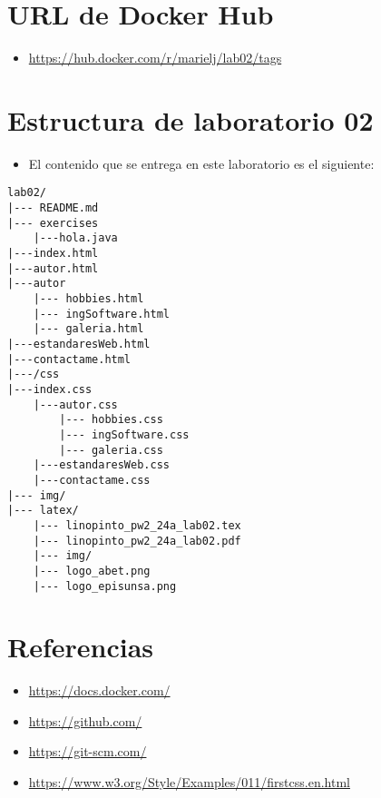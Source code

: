\documentclass{article}
\newcommand{\itemPracticeNumber}{02}
\begin{document}
\section{URL de Docker Hub}
\begin{itemize}
	\item \url{https://hub.docker.com/r/marielj/lab02/tags}
\end{itemize}

\section{Estructura de laboratorio \itemPracticeNumber}
\begin{itemize}
	\item El contenido que se entrega en este laboratorio es el siguiente:
\end{itemize}
\begin{lstlisting}[style=ascii-tree]
lab02/
|--- README.md
|--- exercises
    |---hola.java
|---index.html
|---autor.html
|---autor
    |--- hobbies.html
    |--- ingSoftware.html
    |--- galeria.html
|---estandaresWeb.html
|---contactame.html
|---/css
|---index.css
    |---autor.css
        |--- hobbies.css
        |--- ingSoftware.css
        |--- galeria.css
    |---estandaresWeb.css
    |---contactame.css
|--- img/
|--- latex/
    |--- linopinto_pw2_24a_lab02.tex
    |--- linopinto_pw2_24a_lab02.pdf
    |--- img/
	|--- logo_abet.png
	|--- logo_episunsa.png
\end{lstlisting}

\section{Referencias}
\begin{itemize}
	\item \url{https://docs.docker.com/}
        \item \url{https://github.com/}
        \item \url{https://git-scm.com/}
        \item \url{https://www.w3.org/Style/Examples/011/firstcss.en.html}
\end{itemize}

%
%
%
\end{document}
